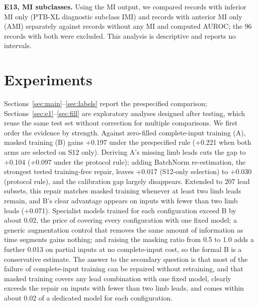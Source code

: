 \textbf{E13, MI subclasses.} Using the MI output, we compared records with inferior MI only (PTB-XL diagnostic subclass IMI) and records with anterior MI only (AMI) separately against records without any MI and computed AUROC; the 96 records with both were excluded. This analysis is descriptive and reports no intervals.

\FloatBarrier
\section{Experiments}
\label{sec:experiments}

Sections~\ref{sec:main}--\ref{sec:labels} report the prespecified comparison; Sections~\ref{sec:e1}--\ref{sec:fill} are exploratory analyses designed after testing, which reuse the same test set without correction for multiple comparisons. We first order the evidence by strength. Against zero-filled complete-input training (A), masked training (B) gains +0.197 under the prespecified rule (+0.221 when both arms are selected on S12 only). Deriving A's missing limb leads cuts the gap to +0.104 (+0.097 under the protocol rule); adding BatchNorm re-estimation, the strongest tested training-free repair, leaves +0.017 (S12-only selection) to +0.030 (protocol rule), and the calibration gap largely disappears. Extended to 207 lead subsets, this repair matches masked training whenever at least two limb leads remain, and B's clear advantage appears on inputs with fewer than two limb leads (+0.071). Specialist models trained for each configuration exceed B by about 0.02, the price of covering every configuration with one fixed model; a generic augmentation control that removes the same amount of information as time segments gains nothing; and raising the masking ratio from 0.5 to 1.0 adds a further 0.013 on partial inputs at no complete-input cost, so the formal B is a conservative estimate. The answer to the secondary question is that most of the failure of complete-input training can be repaired without retraining, and that masked training covers any lead combination with one fixed model, clearly exceeds the repair on inputs with fewer than two limb leads, and comes within about 0.02 of a dedicated model for each configuration.

